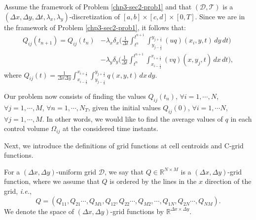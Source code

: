 \begin{prob}
	\label{chp3-sec2-prob2}
	Assume the framework of Problem \ref{chp3-sec2-prob1}
	and that $(\mathcal{D},\mathcal{T})$ is a $(\Delta x, \Delta y, \Delta t, \lambda_x,\lambda_y)$-discretization of $[a,b]\times [c,d]\times [0,T]$.
	Since we are in the framework of Problem \ref{chp3-sec2-prob1}, it follows that:
	\begin{align*}
		{Q}_{ij}(t_{n+1})  = {Q}_{ij}(t_{n})
		&- {\lambda_x}
		\delta _x \bigg( \frac{1}{\Delta t}
		\int_{t^n}^{t^{n+1}} \int_{y_{j-\frac{1}{2}}}^{y_{j+\frac{1}{2}}} 
		{(uq)}(x_{i}, y, t)
		\,dy \,dt \bigg) \\ \nonumber
		&- {\lambda_y}
		\delta _y \bigg( \frac{1}{\Delta t}
		\int_{t^n}^{t^{n+1}} \int_{x_{i-\frac{1}{2}}}^{x_{i+\frac{1}{2}}} 
		{(vq)}(x, y_{j}, t)
		\,dx \,dt \bigg),
	\end{align*}
	where ${Q}_{ij}(t) = \frac{1}{\Delta x \Delta y}
	\int_{x_{i-\frac{1}{2}}}^{x_{i+\frac{1}{2}}} 
	\int_{y_{j-\frac{1}{2}}}^{y_{j+\frac{1}{2}}} {q}(x,y,t) \,dx \,dy$.
	
	Our problem now consists of finding the values ${Q}_{ij}(t_{n})$, 
	$\forall i = 1, \cdots, N$, $\forall j = 1, \cdots, M$, $\forall n = 1, \cdots, N_T$,
    given the initial values ${Q}_{ij}(0)$, $\forall i = 1, \cdots N$, $\forall j = 1, \cdots, M$.
	In other words, we would like to find the average values of ${q}$
	in each control volume $\Omega_{ij}$ at the considered time instants.
\end{prob}
Next, we introduce the definitions of grid functions at cell centroids and C-grid functions. 
\begin{definition}
	\label{chp2-rmk-2d-gridfunction1}
	For a $(\Delta x,\Delta y)$-uniform grid $\mathcal{D}$, we say that $Q \in \mathbb{R}^{N\times M}$ is a 
	$(\Delta x,\Delta y)$-grid function, where we assume that $Q$ is ordered by
	the lines in the $x$ direction of the grid, \textit{i.e.},
	\begin{equation*}
		Q = (Q_{11}, Q_{21} \cdots, Q_{M1}, Q_{12}, Q_{22} \cdots, Q_{M2}, \cdots,  Q_{1N}, Q_{2N} \cdots, Q_{NM}).
	\end{equation*}
	We denote the space of $(\Delta x,\Delta y)$-grid functions by $\mathbb{R}^{\Delta x \times \Delta y}$.
\end{definition}
	
